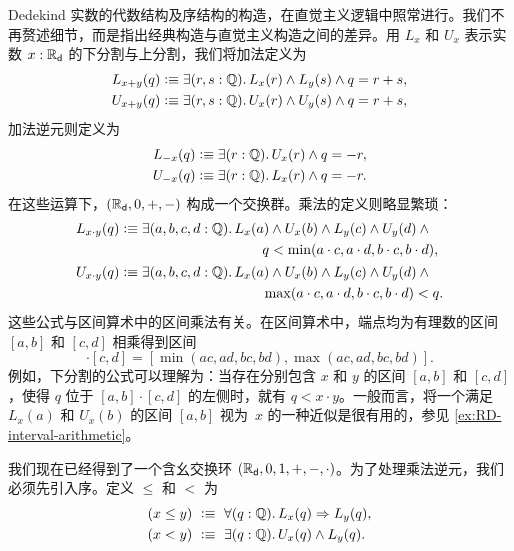 Dedekind 实数的代数结构及序结构的构造，在直觉主义逻辑中照常进行。我们不再赘述细节，而是指出经典构造与直觉主义构造之间的差异。用 $L_x$ 和 $U_x$ 表示实数 $x : \mathbb{R}_\mathsf{d}$ 的下分割与上分割，我们将加法定义为%
%
%
\begin{align*}
  L_{x + y}(q) &\defeq \exis{r, s : \Q} L_x(r) \land L_y(s) \land q = r + s, \\
  U_{x + y}(q) &\defeq \exis{r, s : \Q} U_x(r) \land U_y(s) \land q = r + s,
\end{align*}
%
加法逆元则定义为
%
\begin{align*}
  L_{-x}(q) &\defeq \exis{r : \Q} U_x(r) \land q = - r, \\
  U_{-x}(q) &\defeq \exis{r : \Q} L_x(r) \land q = - r.
\end{align*}
%
在这些运算下，$(\mathbb{R}_\mathsf{d}, 0, {+}, {-})$ 构成一个交换群。乘法的定义则略显繁琐：
%
%
\begin{align*}
  L_{x \cdot y}(q) &\defeq
  \begin{aligned}[t]
    \exis{a, b, c, d : \Q} & L_x(a) \land U_x(b) \land L_y(c) \land U_y(d) \land {}\\
                           & \qquad q < \min (a \cdot c, a \cdot d, b \cdot c, b \cdot d),
  \end{aligned} \\
  U_{x \cdot y}(q) &\defeq
  \begin{aligned}[t]
    \exis{a, b, c, d : \Q} & L_x(a) \land U_x(b) \land L_y(c) \land U_y(d) \land {}\\
                           & \qquad \max (a \cdot c, a \cdot d, b \cdot c, b \cdot d) < q.
  \end{aligned}
\end{align*}
%
%
这些公式与区间算术中的区间乘法有关。在区间算术中，端点均为有理数的区间 $[a,b]$ 和 $[c,d]$ 相乘得到区间
%
\begin{equation*}
  [a,b] \cdot [c,d] =
  [\min(a c, a d, b c, b d), \max(a c, a d, b c, b d)].
\end{equation*}
%
例如，下分割的公式可以理解为：当存在分别包含 $x$ 和 $y$ 的区间 $[a,b]$ 和 $[c,d]$，使得 $q$ 位于 $[a,b] \cdot [c,d]$ 的左侧时，就有 $q < x \cdot y$。一般而言，将一个满足 $L_x(a)$ 和 $U_x(b)$ 的区间 $[a,b]$ 视为~$x$ 的一种近似是很有用的，参见
\cref{ex:RD-interval-arithmetic}。

我们现在已经得到了一个含幺交换环
%
$(\mathbb{R}_\mathsf{d}, 0, 1, {+}, {-}, {\cdot})$。为了处理乘法逆元，我们必须先引入序。定义 $\leq$ 和 $<$ 为
%
\begin{align*}
  (x \leq y) &\ \defeq \ \fall{q : \Q} L_x(q) \Rightarrow L_y(q), \\
  (x < y)    &\ \defeq \ \exis{q : \Q} U_x(q) \land L_y(q).
\end{align*}

